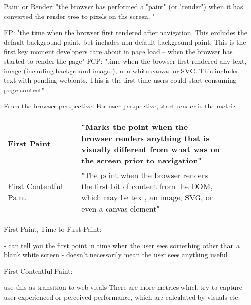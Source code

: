 Paint or Render: "the browser has performed a "paint" (or "render") when it has converted the render tree to pixels on the screen. "

FP: "the time when the browser first rendered after navigation. This excludes the default background paint, but includes non-default background paint. This is the first key moment developers care about in page load – when the browser has started to render the page"
FCP: "time when the browser first rendered any text, image (including background images), non-white canvas or SVG. This includes text with pending webfonts. This is the first time users could start consuming page content"


From the browser perspective.
For user perspective, start render is the metric.

\begin{center}
\small
	\begin{tabular}{ p{0.3\linewidth} | p{0.6\linewidth} }
	\hline
	First Paint & "Marks the point when the browser renders anything that is visually different from what was on the screen prior to navigation"  \\ 
	\hline
	First Contentful Paint & "The point when the browser renders the first bit of content from the DOM, which may be text, an image, SVG, or even a canvas element" \\  
	\hline
	\end{tabular}
\end{center}




First Paint, Time to First Paint: %


- can tell you the first point in time when the user sees something other than a blank white screen
- doesn’t necessarily mean the user sees anything useful


First Contentful Paint: %




use this as transition to web vitals
There are more metrics which try to capture user experienced or perceived performance, which are calculated by visuals etc.








